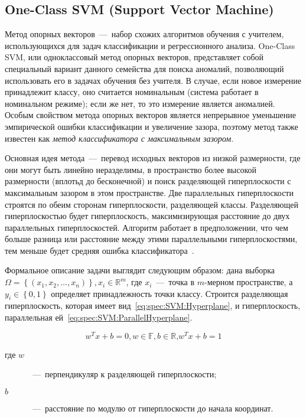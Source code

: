 \subsection{One-Class SVM (Support Vector Machine)}
Метод опорных векторов~---~набор схожих алгоритмов обучения с учителем, использующихся для задач классификации и регрессионного анализа. One-Class SVM, или одноклассовый метод опорных векторов, представляет собой специальный вариант данного семейства для поиска аномалий, позволяющий использовать его в задачах обучения без учителя. В случае, если новое измерение принадлежит классу, оно считается номинальным (система работает в номинальном режиме); если же нет, то это измерение является аномалией. Особым свойством метода опорных векторов является непрерывное уменьшение эмпирической ошибки классификации и увеличение зазора, поэтому метод также известен как \textit{метод классификатора с максимальным зазором}.

Основная идея метода~---~перевод исходных векторов из низкой размерности, где они могут быть линейно неразделимы, в пространство более высокой размерности (вплотьд до бесконечной) и поиск разделяющей гиперплоскости с максимальным зазором в этом пространстве. Две параллельных гиперплоскости строятся по обеим сторонам гиперплоскости, разделяющей классы. Разделяющей гиперплоскостью будет гиперплоскость, максимизирующая расстояние до двух параллельных гиперплоскостей. Алгоритм работает в предположении, что чем больше разница или расстояние между этими параллельными гиперплоскостями, тем меньше будет средняя ошибка классификатора~\cite{LifshitsInternetAlgorithms}.

Формальное описание задачи выглядит следующим образом: дана выборка $\Omega = \left\{(x_1,x_2,\dots,x_n)\right\}, x_i\in {\mathbb{R}}^m$, где $x_i$~---~точка в $m$-мерном пространстве, а $y_i\in \left\{0,1\right\}$ определяет принадлежность точки классу. Строится разделяющая гиперплоскость, которая имеет вид~\eqref{eq:spec:SVM:Hyperplane}, и гиперплоскость, параллельная ей~\eqref{eq:spec:SVM:ParallelHyperplane}.

\begin{subequations}
\begin{equation} \label{eq:spec:SVM:Hyperplane}
w^T x + b = 0, w\in \mathbb{F}, b\in \mathbb{R} \text{,}
\end{equation}
\begin{equation}\label{eq:spec:SVM:ParallelHyperplane}
w^T x + b = 1
\end{equation}
\end{subequations}
\begin{description}
	\item[где $w$]~---~перпендикуляр к разделяющей гиперплоскости;
	\item[$b$]~---~расстояние по модулю от гиперплоскости до начала координат.
\end{description}


